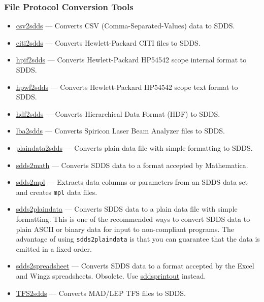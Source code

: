 \documentclass[11pt]{article}
\newcommand{\progref}[1]{\hyperref[#1]{#1}}
\begin{document}
\subsubsection{File Protocol Conversion Tools}

\begin{itemize}
\item \progref{csv2sdds} --- Converts CSV (Comma-Separated-Values) data to SDDS.

\item \progref{citi2sdds} --- Converts Hewlett-Packard CITI files to SDDS.

\item \progref{hpif2sdds} --- Converts Hewlett-Packard HP54542 scope internal format to SDDS.

\item \progref{hpwf2sdds} --- Converts Hewlett-Packard HP54542 scope text format to SDDS.

\item \progref{hdf2sdds} --- Converts Hierarchical Data Format (HDF) to SDDS.

\item \progref{lba2sdds} --- Converts Spiricon Laser Beam Analyzer files to SDDS.

\item \progref{plaindata2sdds} --- Converts plain data file with simple formatting to SDDS.

\item \progref{sdds2math} --- Converts SDDS data to a format accepted by Mathematica.

\item \progref{sdds2mpl} --- Extracts data columns or parameters from an SDDS data set and creates \verb|mpl| data
files\cite{thesis}.

\item \progref{sdds2plaindata} --- Converts SDDS data to a plain data file with simple formatting.  This is
one of the recommended ways to convert SDDS data to plain ASCII or binary data for input to non-compliant
programs.  The advantage of using \verb|sdds2plaindata| is that you can guarantee that the data is 
emitted in a fixed order.

\item \progref{sdds2spreadsheet} --- Converts SDDS data to a format accepted by the Excel and Wingz spreadsheets.
Obsolete.  Use \progref{sddsprintout} instead.

\item \progref{TFS2sdds} --- Converts MAD/LEP TFS files to SDDS.

\end{itemize}
\end{document}
